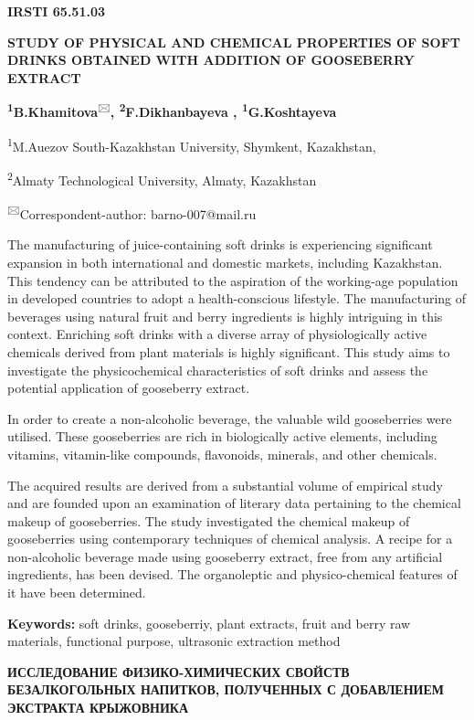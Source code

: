 


\newpage
{\bfseries IRSTI 65.51.03}

{\bfseries STUDY OF PHYSICAL AND CHEMICAL PROPERTIES OF SOFT DRINKS
OBTAINED WITH ADDITION OF GOOSEBERRY EXTRACT}

{\bfseries \textsuperscript{1}B.Khamitova}\textsuperscript{🖂}{\bfseries ,
\textsuperscript{2}F.Dikhanbayeva , \textsuperscript{1}G.Koshtayeva}

\textsuperscript{1}M.Auezov South-Kazakhstan University, Shymkent,
Kazakhstan,

\textsuperscript{2}Almaty Technological University, Almaty, Kazakhstan

\textsuperscript{🖂}Correspondent-author: barno-007@mail.ru

The manufacturing of juice-containing soft drinks is experiencing
significant expansion in both international and domestic markets,
including Kazakhstan. This tendency can be attributed to the aspiration
of the working-age population in developed countries to adopt a
health-conscious lifestyle. The manufacturing of beverages using natural
fruit and berry ingredients is highly intriguing in this context.
Enriching soft drinks with a diverse array of physiologically active
chemicals derived from plant materials is highly significant. This study
aims to investigate the physicochemical characteristics of soft drinks
and assess the potential application of gooseberry extract.~

In order to create a non-alcoholic beverage, the valuable wild
gooseberries were utilised. These gooseberries are rich in biologically
active elements, including vitamins, vitamin-like compounds, flavonoids,
minerals, and other chemicals.~

The acquired results are derived from a substantial volume of empirical
study and are founded upon an examination of literary data pertaining to
the chemical makeup of gooseberries. The study investigated the chemical
makeup of gooseberries using contemporary techniques of chemical
analysis. A recipe for a non-alcoholic beverage made using gooseberry
extract, free from any artificial ingredients, has been devised. The
organoleptic and physico-chemical features of it have been determined.~

{\bfseries Keywords:} soft drinks, gooseberriy, plant extracts, fruit and
berry raw materials, functional purpose, ultrasonic extraction method

{\bfseries ИССЛЕДОВАНИЕ ФИЗИКО-ХИМИЧЕСКИХ СВОЙСТВ БЕЗАЛКОГОЛЬНЫХ НАПИТКОВ,
ПОЛУЧЕННЫХ С ДОБАВЛЕНИЕМ ЭКСТРАКТА КРЫЖОВНИКА}

